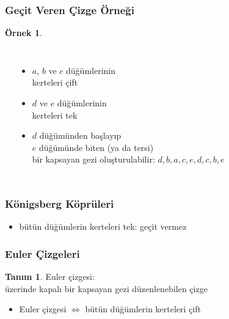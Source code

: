 \documentclass[dvipsnames]{beamer}
\theoremstyle{definition}
\newtheorem{tanim}[theorem]{Tanım}
\theoremstyle{example}
\newtheorem{ornek}[theorem]{Örnek}
\theoremstyle{plain}
\begin{document}
\begin{frame}
  \frametitle{Geçit Veren Çizge Örneği}

  \begin{ornek}
    \begin{columns}
      \begin{center}
      \end{center}

      \pause
      \begin{itemize}
        \item $a$, $b$ ve $c$ düğümlerinin\\
          kerteleri çift
        \item $d$ ve $e$ düğümlerinin\\
          kerteleri tek
        \pause
        \item $d$ düğümünden başlayıp\\
          $e$ düğümünde biten (ya da tersi)\\
          bir kapsayan gezi oluşturulabilir: $d,b,a,c,e,d,c,b,e$
      \end{itemize}
    \end{columns}
  \end{ornek}
\end{frame}

\begin{frame}
  \frametitle{Königsberg Köprüleri}

  \begin{center}
  \end{center}

  \pause
  \begin{itemize}
    \item bütün düğümlerin kerteleri tek: geçit vermez
  \end{itemize}
\end{frame}

\begin{frame}
  \frametitle{Euler Çizgeleri}

  \begin{tanim}
    \alert{Euler çizgesi}:\\
      üzerinde kapalı bir kapsayan gezi düzenlenebilen çizge

    \pause
    \begin{itemize}
      \item Euler çizgesi $\Leftrightarrow$ bütün düğümlerin kerteleri çift
    \end{itemize}
  \end{tanim}
\end{frame}
\end{document}
